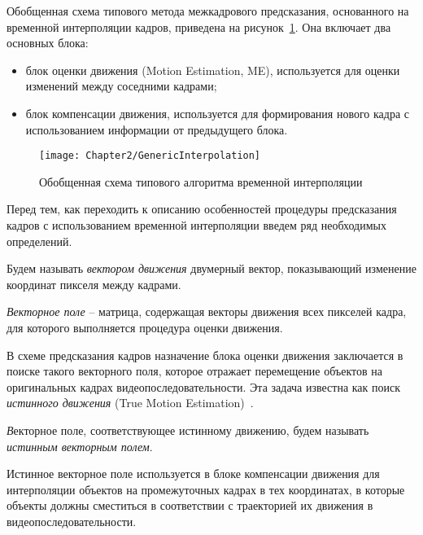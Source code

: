 Обобщенная схема типового метода межкадрового предсказания, основанного на временной интерполяции кадров, приведена на рисунок~\ref{fig:GenericInterpolation}. Она включает два основных блока:
\begin{itemize}
\item блок оценки движения (Motion Estimation, ME), используется для оценки изменений между соседними кадрами;
\item блок компенсации движения, используется для формирования нового кадра с использованием информации от предыдущего блока.
\end{itemize}
\begin{figure}[htbp]
    \begin{center}
        \texttt{[image: Chapter2/GenericInterpolation]}
        \caption{Обобщенная схема типового алгоритма временной интерполяции}
        \label{fig:GenericInterpolation}
    \end{center}
\end{figure}
Перед тем, как переходить к описанию особенностей процедуры предсказания кадров с использованием временной интерполяции введем ряд необходимых определений.
\begin{definition}
    Будем называть \emph{вектором движения} двумерный вектор, показывающий изменение координат пикселя между кадрами.
\end{definition}
\begin{definition}
    \emph{Векторное поле} -- матрица, содержащая векторы движения всех пикселей кадра, для которого выполняется процедура оценки движения.
\end{definition}
В схеме предсказания кадров назначение блока оценки движения заключается в поиске такого векторного поля, которое отражает перемещение объектов на оригинальных кадрах видеопоследовательности. Эта задача известна как поиск \emph{истинного движения} (True Motion Estimation)~\cite{Chen1998}.
\begin{definition}
    \emph Векторное поле, соответствующее истинному движению, будем называть \emph{истинным векторным полем}.
\end{definition}
Истинное векторное поле используется в блоке компенсации движения для интерполяции объектов на промежуточных кадрах в тех координатах, в которые объекты должны сместиться в соответствии с траекторией их движения в видеопоследовательности.

